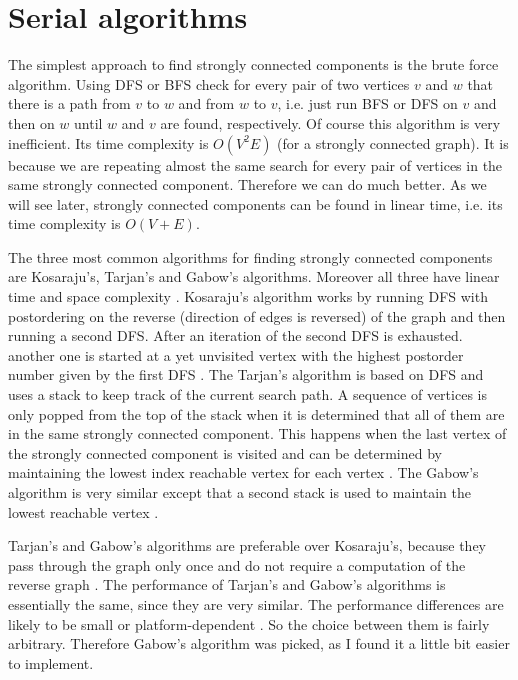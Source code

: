 \documentclass{report}
\theoremstyle{plain}
\theoremstyle{definition}
\theoremstyle{remark}
\numberwithin{definition}{chapter}
\numberwithin{example}{chapter}
\numberwithin{figure}{chapter}
\numberwithin{theorem}{chapter}
\numberwithin{lemma}{chapter}
\begin{document}
\section{Serial algorithms}

The simplest approach to find strongly connected components is the brute force algorithm. Using DFS or BFS check for every pair of two vertices $v$ and $w$ that there is a path from $v$ to $w$ and from $w$ to $v$, i.e. just run BFS or DFS on $v$ and then on $w$ until $w$ and $v$ are found, respectively. Of course this algorithm is very inefficient. Its time complexity is $O(V^2E)$ (for a strongly connected graph). It is because we are repeating almost the same search for every pair of vertices in the same strongly connected component. Therefore we can do much better. As we will see later, strongly connected components can be found in linear time, i.e. its time complexity is $O(V + E)$.

The three most common algorithms for finding strongly connected components are Kosaraju's, Tarjan's and Gabow's algorithms. Moreover all three have linear time and space complexity \cite{c++_sedgewick}. Kosaraju's algorithm works by running DFS with postordering on the reverse (direction of edges is reversed) of the graph and then running a second DFS. After an iteration of the second DFS is exhausted. another one is started at a yet unvisited vertex with the highest postorder number given by the first DFS \cite{c++_sedgewick}. The Tarjan's algorithm is based on DFS and uses a stack to keep track of the current search path. A sequence of vertices is only popped from the top of the stack when it is determined that all of them are in the same strongly connected component. This happens when the last vertex of the strongly connected component is visited and can be determined by maintaining the lowest index  reachable vertex for each vertex \cite{c++_sedgewick}. The Gabow's algorithm is very similar except that a second stack is used to maintain the lowest reachable vertex \cite{c++_sedgewick}.

Tarjan's and Gabow's algorithms are preferable over Kosaraju's, because they pass through the graph only once and do not require a computation of the reverse graph \cite{c++_sedgewick}. The performance of Tarjan's and Gabow's algorithms is essentially the same, since they are very similar. The performance differences are likely to be small or platform-dependent \cite{Gabow2000107}. So the choice between them is fairly arbitrary. Therefore Gabow's algorithm was picked, as I found it a little bit easier to implement.
\end{document}
